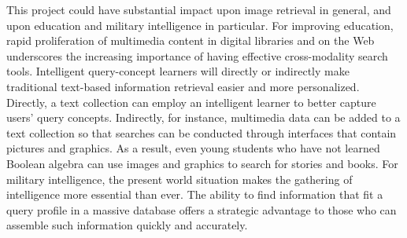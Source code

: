 This project could have substantial impact upon image retrieval in
general, and upon education and military intelligence in particular.
For improving education, rapid proliferation of multimedia content in
digital libraries and on the Web underscores the increasing importance
of having effective cross-modality search tools.  Intelligent
query-concept learners will directly or indirectly make traditional
text-based information retrieval easier and more personalized.
Directly, a text collection can employ an intelligent learner to
better capture users' query concepts.  Indirectly, for instance,
multimedia data can be added to a text collection so that searches can
be conducted through interfaces that contain pictures and graphics. As
a result, even young students who have not learned Boolean algebra can
use images and graphics to search for stories and books.  For military
intelligence, the present world situation makes the gathering of
intelligence more essential than ever.  The ability to find
information that fit a query profile in a massive database offers a
strategic advantage to those who can assemble such information quickly
and accurately.



